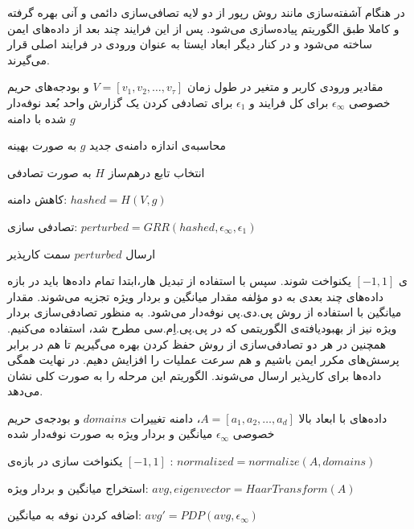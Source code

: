 در هنگام آشفته‌سازی مانند روش رپور از دو لایه تصافی‌سازی دائمی و آنی بهره گرفته و کاملا طبق الگوریتم  پیاده‌سازی می‌شود. پس از این فرایند چند بعد از داده‌های ایمن ساخته‌ می‌شود و در کنار دیگر ابعاد ایستا به عنوان ورودی در فرایند اصلی قرار می‌گیرند.

 مقادیر ورودی کاربر و متغیر در طول زمان $V = [v_1, v_2, \ldots, v_\tau]$ و بودجه‌های حریم خصوصی $\epsilon_\infty$ برای کل فرایند و $\epsilon_1$ برای تصادفی کردن یک گزارش واحد 
 بُعد نوفه‌دار شده با دامنه $g$

 محاسبه‌ی اندازه دامنه‌ی جدید $g$ به صورت بهینه

 انتخاب تابع درهم‌ساز $H$ به صورت تصادفی

 کاهش دامنه: $hashed = H(V, g)$

 تصادفی سازی: $perturbed = GRR(hashed, \epsilon_\infty, \epsilon_1)$

 ارسال $perturbed$ سمت کارپذیر



ابتدا تمام داده‌ها باید در بازه‌‎ی $[-1, 1]$ یکنواخت شوند. سپس با استفاده از تبدیل هار، داده‌های چند بعدی به دو مؤلفه مقدار میانگین و بردار ویژه تجزیه می‌شوند. مقدار میانگین با استفاده از روش پی.دی.پی نوفه‌دار می‌شود. به منظور تصادفی‌سازی بردار ویژه نیز از بهبودیافته‌ی الگوریتمی که در پی.پی.اِم.سی مطرح شد، استفاده ‌می‌کنیم. همچنین در هر دو تصادفی‌سازی از روش حفظ کردن بهره می‌گیریم تا هم در برابر پرسش‌های مکرر ایمن باشیم و هم سرعت عملیات را افزایش دهیم. در نهایت همگی داده‌ها برای کارپذیر ارسال می‌شوند. الگوریتم  این مرحله را به صورت کلی نشان می‌دهد.

 داده‌های با ابعاد بالا $A = [a_1, a_2, \ldots, a_d]$، دامنه تغییرات $domains$ و بودجه‌ی حریم خصوصی $\epsilon_\infty$
 میانگین و بردار ویژه به صورت نوفه‌دار شده

 یکنواخت سازی در بازه‌ی $[-1, 1]$ : $normalized = normalize(A, domains)$

 استخراج میانگین و بردار ویژه: $avg, eigenvector = HaarTransform(A)$

 اضافه کردن نوفه به میانگین: $avg' = PDP(avg, \epsilon_\infty)$

